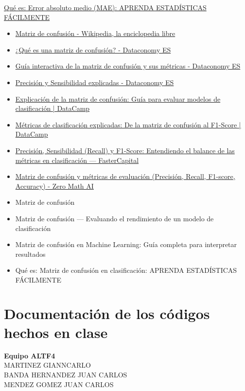 \documentclass[]{article}
\begin{document}
\href{https://es.statisticseasily.com/glosario/\%C2\%BFQu\%C3\%A9-significa-error-absoluto-mae\%3F/\#google_vignette}{Qué
es: Error absoluto medio (MAE): APRENDA ESTADÍSTICAS FÁCILMENTE}

\begin{itemize}
    \item \href{https://es.wikipedia.org/wiki/Matriz_de_confusi%C3%B3n}{Matriz de confusión - Wikipedia, la enciclopedia libre}
    \item \href{https://dataconomy.es/}{¿Qué es una matriz de confusión? - Dataconomy ES}
    \item \href{https://dataconomy.es/}{Guía interactiva de la matriz de confusión y sus métricas - Dataconomy ES}
    \item \href{https://dataconomy.es/}{Precisión y Sensibilidad explicadas - Dataconomy ES}
    \item \href{https://www.datacamp.com/es}{Explicación de la matriz de confusión: Guía para evaluar modelos de clasificación | DataCamp}
    \item \href{https://www.datacamp.com/es}{Métricas de clasificación explicadas: De la matriz de confusión al F1-Score | DataCamp}
    \item \href{https://fastercapital.com/es/}{Precisión, Sensibilidad (Recall) y F1-Score: Entendiendo el balance de las métricas en clasificación — FasterCapital}
    \item \href{https://zeromath.ai/}{Matriz de confusión y métricas de evaluación (Precisión, Recall, F1-score, Accuracy) - Zero Math AI}
    \item Matriz de confusión
    \item Matriz de confusión — Evaluando el rendimiento de un modelo de clasificación
    \item Matriz de confusión en Machine Learning: Guía completa para interpretar resultados
    \item Qué es: Matriz de confusión en clasificación: APRENDA ESTADÍSTICAS FÁCILMENTE
\end{itemize}

\newpage

\section*{Documentación de los códigos hechos en clase}\label{intrdoc}

\textbf{Equipo ALTF4}\\
MARTINEZ GIANNCARLO\\
BANDA HERNANDEZ JUAN CARLOS\\
MENDEZ GOMEZ JUAN CARLOS
\label{doc1}
\end{document}
